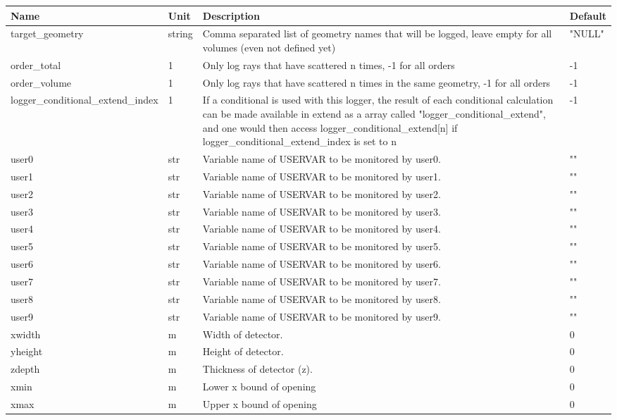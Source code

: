 \begin{longtable}{p{}p{}p{}p{}}
\toprule
\textbf{Name} & \textbf{Unit} & \textbf{Description} & \textbf{Default} \\
\midrule
\endhead
target\_geometry & string & Comma separated list of geometry names that will be logged, leave empty for all volumes (even not defined yet) & "NULL" \\
order\_total & 1 & Only log rays that have scattered n times, -1 for all orders & -1 \\
order\_volume & 1 & Only log rays that have scattered n times in the same geometry, -1 for all orders & -1 \\
logger\_conditional\_extend\_index & 1 & If a conditional is used with this logger, the result of each conditional calculation can be made available in extend as a array called "logger\_conditional\_extend", and one would then access logger\_conditional\_extend[n] if logger\_conditional\_extend\_index is set to n & -1 \\
user0 & str & Variable name of USERVAR to be monitored by user0. & "" \\
user1 & str & Variable name of USERVAR to be monitored by user1. & "" \\
user2 & str & Variable name of USERVAR to be monitored by user2. & "" \\
user3 & str & Variable name of USERVAR to be monitored by user3. & "" \\
user4 & str & Variable name of USERVAR to be monitored by user4. & "" \\
user5 & str & Variable name of USERVAR to be monitored by user5. & "" \\
user6 & str & Variable name of USERVAR to be monitored by user6. & "" \\
user7 & str & Variable name of USERVAR to be monitored by user7. & "" \\
user8 & str & Variable name of USERVAR to be monitored by user8. & "" \\
user9 & str & Variable name of USERVAR to be monitored by user9. & "" \\
xwidth & m & Width of detector. & 0 \\
yheight & m & Height of detector. & 0 \\
zdepth & m & Thickness of detector (z). & 0 \\
xmin & m & Lower x bound of opening & 0 \\
xmax & m & Upper x bound of opening & 0 \\

\end{longtable}
